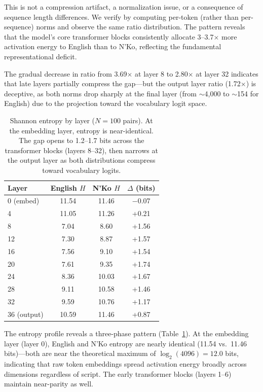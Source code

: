 \documentclass[11pt]{article}
\begin{document}
This is not a compression artifact, a normalization issue, or a consequence of sequence length differences.
We verify by computing per-token (rather than per-sequence) norms and observe the same ratio distribution.
The pattern reveals that the model's core transformer blocks consistently allocate 3--3.7$\times$ more activation energy to English than to N'Ko, reflecting the fundamental representational deficit.

The gradual decrease in ratio from 3.69$\times$ at layer 8 to 2.80$\times$ at layer 32 indicates that late layers partially compress the gap---but the output layer ratio (1.72$\times$) is deceptive, as both norms drop sharply at the final layer (from $\sim$4{,}000 to $\sim$154 for English) due to the projection toward the vocabulary logit space.

\begin{table}[t]
\centering
\small
\begin{tabular}{lccc}
\toprule
\textbf{Layer} & \textbf{English $H$} & \textbf{N'Ko $H$} & \textbf{$\Delta$ (bits)} \\
\midrule
0 (embed) & 11.54 & 11.46 & $-$0.07 \\
4 & 11.05 & 11.26 & +0.21 \\
8 & 7.04 & 8.60 & +1.56 \\
12 & 7.30 & 8.87 & +1.57 \\
16 & 7.56 & 9.10 & +1.54 \\
20 & 7.61 & 9.35 & +1.74 \\
24 & 8.36 & 10.03 & +1.67 \\
28 & 9.11 & 10.58 & +1.46 \\
32 & 9.59 & 10.76 & +1.17 \\
36 (output) & 10.59 & 11.46 & +0.87 \\
\bottomrule
\end{tabular}
\caption{Shannon entropy by layer ($N=100$ pairs). At the embedding layer, entropy is near-identical. The gap opens to 1.2--1.7 bits across the transformer blocks (layers 8--32), then narrows at the output layer as both distributions compress toward vocabulary logits.}
\label{tab:entropy}
\end{table}

The entropy profile reveals a three-phase pattern (Table~\ref{tab:entropy}).
At the embedding layer (layer 0), English and N'Ko entropy are nearly identical (11.54 vs.\ 11.46 bits)---both are near the theoretical maximum of $\log_2(4096) = 12.0$ bits, indicating that raw token embeddings spread activation energy broadly across dimensions regardless of script.
The early transformer blocks (layers 1--6) maintain near-parity as well.
\end{document}
